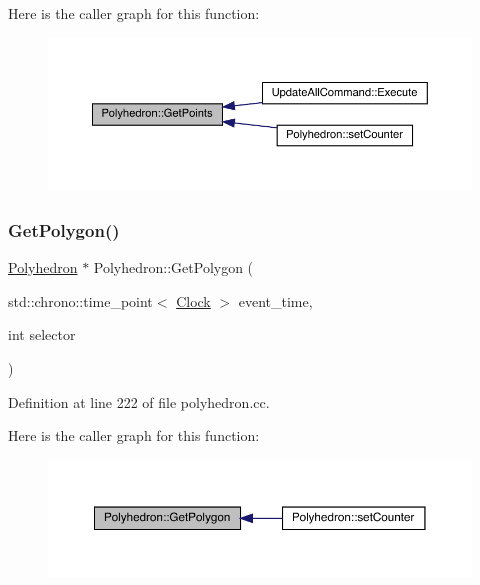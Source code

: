 Here is the caller graph for this function\+:
\nopagebreak
\begin{figure}[H]
\begin{center}
\leavevmode
\includegraphics[width=350pt]{class_polyhedron_a1430429d6c8447e90b8c94ca46496a59_icgraph}
\end{center}
\end{figure}
\mbox{\label{class_polyhedron_a8b197b9eb163bdc83d9669d592bacac1}} 
\subsubsection{\texorpdfstring{Get\+Polygon()}{GetPolygon()}}
{\footnotesize\ttfamily \hyperlink{class_polyhedron}{Polyhedron} $\ast$ Polyhedron\+::\+Get\+Polygon (\begin{DoxyParamCaption}\item[{std\+::chrono\+::time\+\_\+point$<$ \hyperlink{universe_8h_a0ef8d951d1ca5ab3cfaf7ab4c7a6fd80}{Clock} $>$}]{event\+\_\+time,  }\item[{int}]{selector }\end{DoxyParamCaption})}



Definition at line 222 of file polyhedron.\+cc.

Here is the caller graph for this function\+:
\nopagebreak
\begin{figure}[H]
\begin{center}
\leavevmode
\includegraphics[width=350pt]{class_polyhedron_a8b197b9eb163bdc83d9669d592bacac1_icgraph}
\end{center}
\end{figure}
\mbox{\label{class_polyhedron_adeaf461cc8504a225f6344b954c196a8}} 
